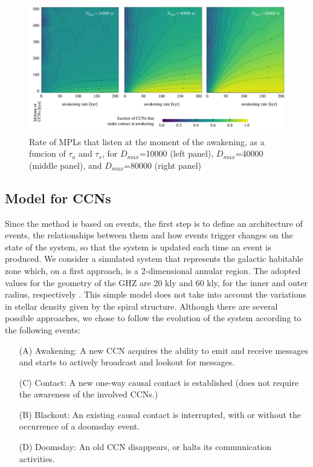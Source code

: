 \documentclass[crop]{CSLB}
\newcommand{\ceti}{CCN}
\newcommand{\cetis}{CCNs}
\begin{document}
\begin{figure} %
   \centering
   \includegraphics[width=\textwidth]{F_C_at_A.pdf}
   \caption{
Rate of MPLs that listen at the moment of the
awakening, as a funcion of $\tau_a$ and $\tau_s$, for
$D_{max}$=10000 (left panel),
$D_{max}$=40000 (middle panel), and
$D_{max}$=80000 (right panel)
%
   }
   \label{F_C_at_A}
\end{figure}
 

\subsection{Model for \cetis{}}

Since the method is based on events, the first step is to define an
architecture of events, the relationships between them and how events
trigger changes on the state of the system,
so that the system is updated each time an event is produced.
%
We consider a simulated system that represents the galactic habitable
zone which, on a first approach, is a 2-dimensional annular region.
%
The adopted values for the geometry of the GHZ are 20 kly and 60 kly, for the inner
and outer radius, respectively \citep{lineweaver_galactic_2004}.
%
This simple model does not take into account the variations in stellar
density given by the spiral structure.
%
Although there are several possible approaches, we chose to follow the
evolution of the system according to the following events:

\begin{enumerate}
   \item[(A)] Awakening: A new \ceti{} acquires the ability to emit
      and receive messages and starts to actively broadcast and
      lookout for messages.
   \item[(C)] Contact: A new one-way causal contact is established
      (does not require the awareness of the involved \cetis{}.)
   \item[(B)] Blackout: An existing causal contact is interrupted,
      with or without the occurrence of a doomsday event.
   \item[(D)] Doomsday: An old \ceti{} disappears, or halts its
      communication activities.
\end{enumerate}
\end{document}

